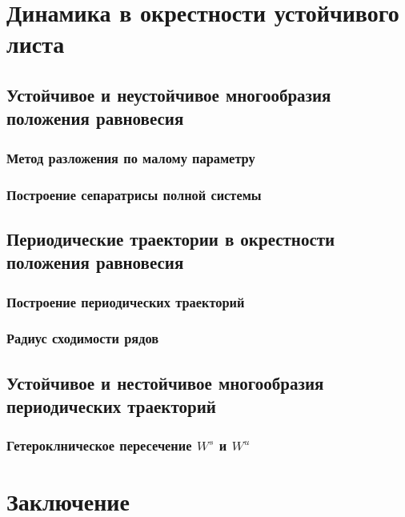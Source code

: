 \documentclass[a4paper, 12pt]{article}
\begin{document}
    \section{Динамика в окрестности устойчивого листа}
        
        
        \subsection{Устойчивое и неустойчивое многообразия положения равновесия}
        
            \subsubsection{Метод разложения по малому параметру}
            

            \subsubsection{Построение сепаратрисы полной системы}
            

        \subsection{Периодические траектории в окрестности положения равновесия}
        
            \subsubsection{Построение периодических траекторий}
            

            \subsubsection{Радиус сходимости рядов}
            

        \subsection{Устойчивое и нестойчивое многообразия периодических траекторий}
        
            \subsubsection{Гетероклническое пересечение $W^s$ и $W^u$}
            


    \section{Заключение}

\end{document}
